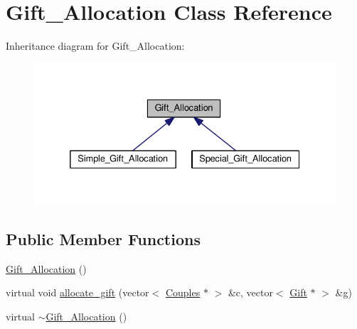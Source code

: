 \hypertarget{class_gift___allocation}{\section{Gift\-\_\-\-Allocation Class Reference}
\label{class_gift___allocation}
}


Inheritance diagram for Gift\-\_\-\-Allocation\-:
\nopagebreak
\begin{figure}[H]
\begin{center}
\leavevmode
\includegraphics[width=332pt]{class_gift___allocation__inherit__graph}
\end{center}
\end{figure}
\subsection*{Public Member Functions}
\begin{DoxyCompactItemize}
\item 
\hyperlink{class_gift___allocation_a90052b00de2f8dea79ed652f51d61d30}{Gift\-\_\-\-Allocation} ()
\item 
virtual void \hyperlink{class_gift___allocation_a72d031f6e9b6c819679428d5b81956ec}{allocate\-\_\-gift} (vector$<$ \hyperlink{class_couples}{Couples} $\ast$ $>$ \&c, vector$<$ \hyperlink{class_gift}{Gift} $\ast$ $>$ \&g)
\item 
virtual \hyperlink{class_gift___allocation_a47cfd70195c35019a967a718371c4387}{$\sim$\-Gift\-\_\-\-Allocation} ()
\end{DoxyCompactItemize}


